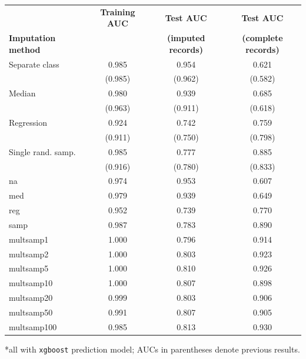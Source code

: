 \documentclass[12pt]{article}
\begin{document}
\begin{table}[ht]
\centering
\begin{tabular}{lccc}
  \toprule
 & \textbf{Training AUC} & \textbf{Test AUC} & \textbf{Test AUC} \\
\textbf{Imputation method}& & \textbf{(imputed records)} & \textbf{(complete records)} \\
  \midrule
Separate class & 0.985 & 0.954 & 0.621 \\ 
 & (0.985) & (0.962) & (0.582) \\ \addlinespace
Median & 0.980 & 0.939 & 0.685 \\ 
   & (0.963) & (0.911) & (0.618) \\ \addlinespace
Regression & 0.924 & 0.742 & 0.759 \\ 
   & (0.911) & (0.750) & (0.798) \\ \addlinespace
Single rand. samp. & 0.985 & 0.777 & 0.885 \\ 
   & (0.916) & (0.780) & (0.833) \\ 
   
   na & 0.974 & 0.953 & 0.607 \\ 
  med & 0.979 & 0.939 & 0.649 \\ 
  reg & 0.952 & 0.739 & 0.770 \\ 
  samp & 0.987 & 0.783 & 0.890 \\ 
  multsamp1 & 1.000 & 0.796 & 0.914 \\ 
  multsamp2 & 1.000 & 0.803 & 0.923 \\ 
  multsamp5 & 1.000 & 0.810 & 0.926 \\ 
  multsamp10 & 1.000 & 0.807 & 0.898 \\ 
  multsamp20 & 0.999 & 0.803 & 0.906 \\ 
  multsamp50 & 0.991 & 0.807 & 0.905 \\ 
  multsamp100 & 0.985 & 0.813 & 0.930 \\ 
   \bottomrule
\end{tabular}
   *all with \texttt{xgboost} prediction model; AUCs in parentheses 
   denote previous results.
\end{table}
\end{document}
